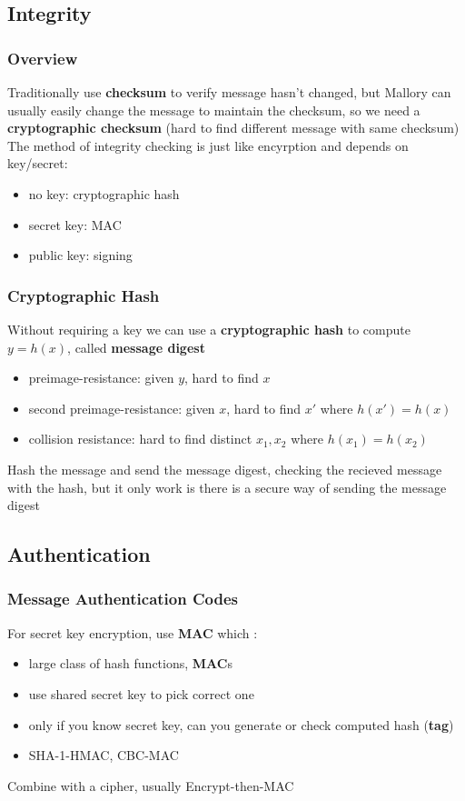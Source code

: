 \documentclass[]{article}
\theoremstyle{definition}
\begin{document}
	\subsection{Integrity}
	\subsubsection{Overview}
	Traditionally use \textbf{checksum} to verify message hasn't changed, but Mallory can usually easily change the message to maintain the checksum, so we need a \textbf{cryptographic checksum} (hard to find different message with same checksum) \\

	The method of integrity checking is just like encyrption and depends on key/secret:
	\begin{itemize}
		\item no key: cryptographic hash
		\item secret key: MAC
		\item public key: signing
	\end{itemize}

	\subsubsection{Cryptographic Hash}
	Without requiring a key we can use a \textbf{cryptographic hash} to compute $y = h(x)$, called \textbf{message digest}
	\begin{itemize}
		\item preimage-resistance: given $y$, hard to find $x$
		\item second preimage-resistance: given $x$, hard to find $x'$ where $h(x') = h(x)$
		\item collision resistance: hard to find distinct $x_1, x_2$ where $h(x_1) = h(x_2)$
	\end{itemize}
	Hash the message and send the message digest, checking the recieved message with the hash, but it only work is there is a secure way of sending the message digest


	\subsection{Authentication}
	\subsubsection{Message Authentication Codes}
	For secret key encryption, use \textbf{MAC} which :
	\begin{itemize}
		\item large class of hash functions, \textbf{MAC}s
		\item use shared secret key to pick correct one
		\item only if you know secret key, can you generate or check computed hash (\textbf{tag})
		\item SHA-1-HMAC, CBC-MAC
	\end{itemize}
	Combine with a cipher, usually Encrypt-then-MAC
\end{document}
